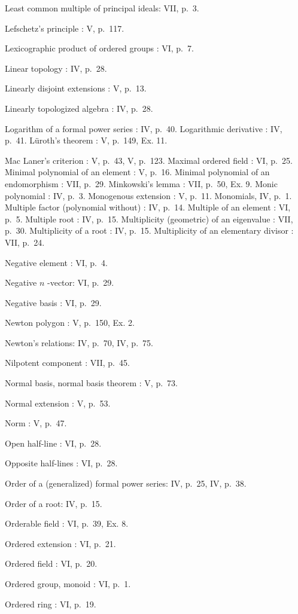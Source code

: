 Least common multiple of principal ideals: VII, p.~3.

Lefschetz's principle : V, p.~117.

Lexicographic product of ordered groups : VI, p.~7.

Linear topology : IV, p.~28.

Linearly disjoint extensions : V, p.~13.

Linearly topologized algebra : IV, p.~28.

Logarithm of a formal power series : IV, p.~40. Logarithmic derivative : IV, p.~41. Lüroth's theorem : V, p.~149, Ex. 11.

Mac Laner's criterion : V, p.~43, V, p.~123. Maximal ordered field : VI, p.~25. Minimal polynomial of an element : V, p.~16. Minimal polynomial of an endomorphism : VII, p.~29. Minkowski's lemma : VII, p.~50, Ex. 9. Monic polynomial : IV, p.~3. Monogenous extension : V, p.~11. Monomials, IV, p.~1. Multiple factor (polynomial without) : IV, p.~14. Multiple of an element : VI, p.~5. Multiple root : IV, p.~15. Multiplicity (geometric) of an eigenvalue : VII, p.~30. Multiplicity of a root : IV, p.~15. Multiplicity of an elementary divisor : VII, p.~24.

Negative element : VI, p.~4.

Negative \(n\) -vector: VI, p.~29.

Negative basis : VI, p.~29.

Newton polygon : V, p.~150, Ex. 2.

Newton's relations: IV, p.~70, IV, p.~75.

Nilpotent component : VII, p.~45.

Normal basis, normal basis theorem : V, p.~73.

Normal extension : V, p.~53.

Norm : V, p.~47.

Open half-line : VI, p.~28.

Opposite half-lines : VI, p.~28.

Order of a (generalized) formal power series: IV, p.~25, IV, p.~38.

Order of a root: IV, p.~15.

Orderable field : VI, p.~39, Ex. 8.

Ordered extension : VI, p.~21.

Ordered field : VI, p.~20.

Ordered group, monoid : VI, p.~1.

Ordered ring : VI, p.~19.

